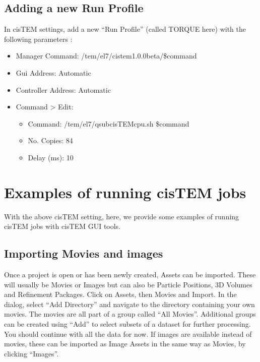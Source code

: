 \documentclass[a4paper,10pt,english]{sphinxmanual}
\begin{document}
\subsection{Adding a new Run Profile}
\label{\detokenize{cisTEM:adding-a-new-run-profile}}
\sphinxAtStartPar
In cisTEM settings, add a new “Run Profile” (called TORQUE here) with the following parameters :
\begin{itemize}
\item {} 
\sphinxAtStartPar
Manager Command: /tem/el7/cistem\sphinxhyphen{}1.0.0\sphinxhyphen{}beta/\$command

\item {} 
\sphinxAtStartPar
Gui Address: Automatic

\item {} 
\sphinxAtStartPar
Controller Address: Automatic

\item {} 
\sphinxAtStartPar
Command \sphinxhyphen{}> Edit:
\begin{itemize}
\item {} 
\sphinxAtStartPar
Command: /tem/el7/qsub\sphinxhyphen{}cisTEM\sphinxhyphen{}cpu.sh  \$command

\item {} 
\sphinxAtStartPar
No. Copies: 84

\item {} 
\sphinxAtStartPar
Delay (ms): 10

\end{itemize}

\end{itemize}



\section{Examples of running cisTEM jobs}
\label{\detokenize{cisTEM:examples-of-running-cistem-jobs}}
\sphinxAtStartPar
With the above cisTEM setting, here, we provide some examples of running cisTEM jobs with cisTEM GUI tools.


\subsection{Importing Movies and images}
\label{\detokenize{cisTEM:importing-movies-and-images}}
\sphinxAtStartPar
Once a project is open or has been newly created, Assets can be imported. These will usually be Movies or Images but can also be Particle Positions, 3D Volumes and Refinement Packages.
Click on Assets, then Movies and Import. In the dialog, select “Add Directory” and navigate to the directory containing your own movies.
The movies are all part of a group called “All Movies”. Additional groups can be created using “Add” to select subsets of a dataset for further processing.
You should continue with all the data for now. If images are available instead of movies,
these can be imported as Image Assets in the same way as Movies, by clicking “Images”.
\end{document}
